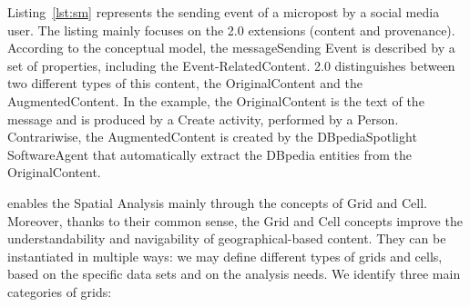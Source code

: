 Listing~\ref{lst:sm} represents the sending event of a micropost by a social media user.
The listing mainly focuses on the \frappe{} 2.0 extensions (content and provenance).
According to the \frappe{} conceptual model, the \textsf{messageSending} \textsf{Event} is described by a set of properties, including the \textsf{Event-RelatedContent}.
\frappe{} 2.0 distinguishes between two different types of this content, the \textsf{OriginalContent} and the \textsf{AugmentedContent}.
In the example, the \textsf{OriginalContent} is the text of the message and is produced by a \textsf{Create} activity, performed by a \textsf{Person}. Contrariwise, the \textsf{AugmentedContent} is created by the DBpediaSpotlight \textsf{SoftwareAgent} that automatically extract the DBpedia entities from the \textsf{OriginalContent}.

\frappe{} enables the Spatial Analysis mainly through the concepts of \textsf{Grid} and \textsf{Cell}. 
Moreover, thanks to their common sense, the \textsf{Grid} and \textsf{Cell} concepts improve the understandability and navigability of geographical-based content. 
They can be instantiated in multiple ways: we may define different types of grids and cells, based on the specific data sets and on the analysis needs. We identify three main categories of grids: 

